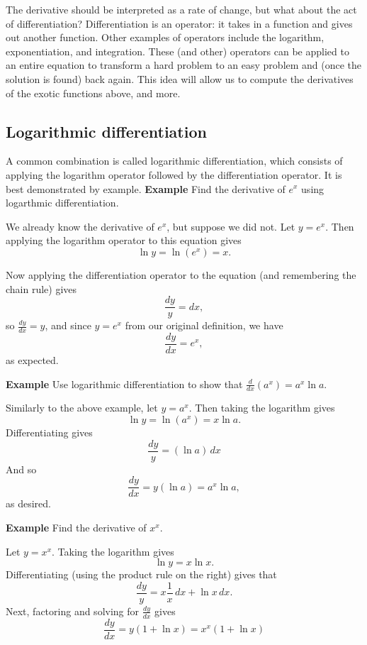 \documentclass[twoside,openright,titlepage,a4paper]{book}
\begin{document}
\begin{sloppypar}
The derivative should be interpreted as a rate of change, but what about the act of differentiation? Differentiation is an operator: it takes in a function and gives out another function. Other examples of operators include the logarithm, exponentiation, and integration. These (and other) operators can be applied to an entire equation to transform a hard problem to an easy problem and (once the solution is found) back again. This idea will allow us to compute the derivatives of the exotic functions above, and more.

\subsection{Logarithmic differentiation}
A common combination is called logarithmic differentiation, which consists of applying the logarithm operator followed by the differentiation operator. It is best demonstrated by example.
\bigbreak
\textbf{Example} Find the derivative of $e^x$ using logarthmic differentiation. 
\begin{examplebox}
We already know the derivative of $e^x$, but suppose we did not. Let $y = e^x$. Then applying the logarithm operator to this equation gives \[ \ln y = \ln(e^x) = x. \]

Now applying the differentiation operator to the equation (and remembering the chain rule) gives \[ \frac{dy}{y} = dx, \] so $\frac{dy}{dx} = y$, and since $y=e^x$ from our original definition, we have \[ \frac{dy}{dx} = e^x, \] as expected.
\end{examplebox}
\bigbreak
\textbf{Example} Use logarithmic differentiation to show that $\frac{d}{dx}(a^x) = a^x \ln a$. 
\begin{examplebox}
Similarly to the above example, let $y = a^x$. Then taking the logarithm gives \[ \ln y = \ln(a^x) = x \ln a. \]
Differentiating gives \[ \frac{dy}{y} = (\ln a) \, dx \]
And so \[ \frac{dy}{dx} = y (\ln a) = a^x \ln a, \] as desired.	
\end{examplebox}
\bigbreak
\textbf{Example} Find the derivative of $x^x$.
\begin{examplebox}
Let $y=x^x$. Taking the logarithm gives \[ \ln y = x \ln x. \]
Differentiating (using the product rule on the right) gives that \[ \frac{dy}{y} = x \frac{1}{x}\,dx + \ln x\,dx. \]
Next, factoring and solving for $\frac{dy}{dx}$ gives \[ \frac{dy}{dx} = y(1+\ln x) = x^x(1+\ln x) \]	
\end{examplebox}	


\end{sloppypar}
\end{document}
